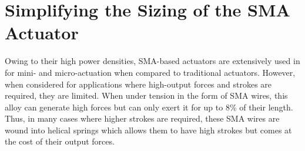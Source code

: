 \section{Simplifying the Sizing of the SMA Actuator}\label{sec:simplified-sma-model}
Owing to their high power densities, SMA-based actuators are extensively used in for mini- and micro-actuation when compared to traditional actuators. However, when considered for applications where high-output forces and strokes are required, they are limited. When under tension in the form of SMA wires, this alloy can generate high forces but can only exert it for up to 8\% of their length. Thus, in many cases where higher strokes are required, these SMA wires are wound into helical springs which allows them to have high strokes but comes at the cost of their output forces.

